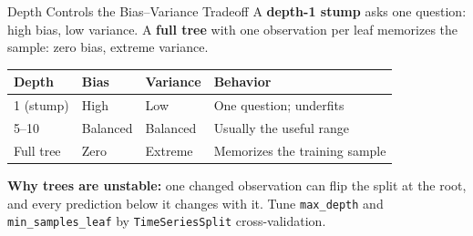 \documentclass[aspectratio=169, 11pt]{beamer}
\begin{document}
\begin{frame}{Depth Controls the Bias--Variance Tradeoff}
  A \textbf{depth-1 stump} asks one question: high bias, low variance. A
  \textbf{full tree} with one observation per leaf memorizes the sample: zero
  bias, extreme variance.

  \vspace{0.15cm}
  \begin{center}
    {\small
    \begin{tabular}{llll}
      \toprule
      \textbf{Depth} & \textbf{Bias} & \textbf{Variance} & \textbf{Behavior} \\
      \midrule
      1 (stump)  & High     & Low      & One question; underfits \\
      5--10      & Balanced & Balanced & Usually the useful range \\
      Full tree  & Zero     & Extreme  & Memorizes the training sample \\
      \bottomrule
    \end{tabular}
    }
  \end{center}
  \vspace{0.1cm}
  \vspace{-0.2cm}
  \textbf{Why trees are unstable:} one changed observation can flip the split
  at the root, and every prediction below it changes with it.
  Tune \texttt{max\_depth} and \texttt{min\_samples\_leaf} by
  \texttt{TimeSeriesSplit} cross-validation.
\end{frame}
\end{document}
